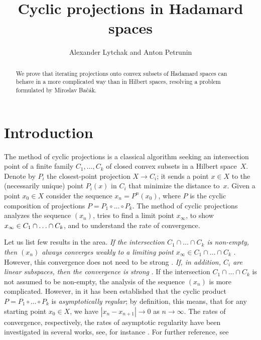 \documentclass[a4paper,10pt]{article}
\def\thetitle{Cyclic projections in Hadamard spaces}
\def\theauthors{Alexander Lytchak and Anton Petrunin}
\begin{document}


\title{\thetitle}	
\author{\theauthors}
\date{}
\maketitle

\begin{abstract}
We  prove that iterating projections onto convex subsets of Hadamard spaces can behave in a more complicated way than in Hilbert spaces, resolving a problem formulated by Miroslav Bačák.
\end{abstract}


\section{Introduction}

The method of cyclic  projections is a classical algorithm seeking  an intersection point of a finite family  $C_1,\dots, C_k$ of  closed convex subsets in a Hilbert  space~$X$.
Denote by $P_i$ the closest-point projection $X\to C_i$; it sends a point $x\in X$ to the (necessarily unique) point $P_i(x)$ in $C_i$ that minimize the distance to~$x$.
Given a point $x_0\in X$ consider the sequence $x_n=P^n(x_0)$, where
$P$ is the  cyclic composition of projections $P= P_1\circ \dots \circ P_k$.  The method of cyclic projections analyzes the sequence $(x_n)$, tries to find a limit point $x_{\infty}$, to show $x_{\infty} \in C_1\cap\z\dots\cap C_k$, and to understand the  rate of convergence.

Let us list few results in the area.
\emph{If the intersection  $C_1\cap \dots\cap C_k$ is non-empty, then $(x_n)$ always converges weakly to a limiting point $x_{\infty} \in  C_1\cap \dots\cap C_k$} \cite{bregman}.
However, this convergence does not need to be strong \cite{hundal}.
\emph{If, in addition,  $C_i$ are  linear subspaces, then the convergence is strong} \cite{vonneumann,halperin}.
If the intersection  $C_1\cap \dots\cap C_k$ is not assumed to be non-empty,  the analysis of the sequence $(x_n)$ is more complicated.
However, in \cite{bauschke} it has been established that the cyclic product $P= P_1\circ \dots \circ P_k$ is \emph{asymptotically regular};
by definition, this means, that for any starting point  $x_0\in X$, we have  $|x_n-x_{n+1}|\to 0$ as $n\to \infty$.
The rates of convergence, respectively, the rates of asymptotic regularity have been investigated in several works, see, for instance \cite{bauschke-borwein-lewis, Kohlenbach}.
For further reference, see \cite{bauschke-borwein-lewis, deutsch, Bac, Bac2}
\end{document}
